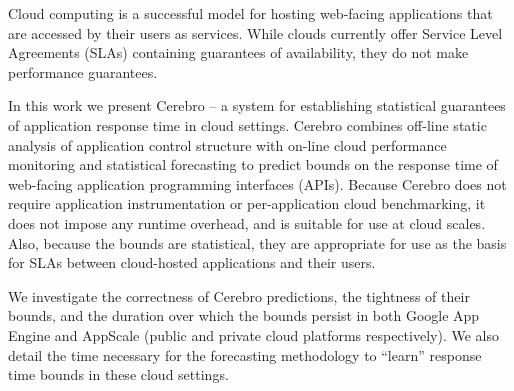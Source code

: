 Cloud computing is a successful model for hosting web-facing
applications that are accessed by their users as services.  While clouds
currently offer Service Level Agreements (SLAs) containing guarantees of
availability, they do not make performance guarantees.

In this work we present Cerebro -- a system for establishing statistical
guarantees of application response time in cloud settings.  Cerebro combines
off-line static analysis of application control structure with on-line cloud
performance monitoring and statistical forecasting to predict bounds on the
response time of web-facing application programming interfaces (APIs).
Because Cerebro does not require application instrumentation or 
per-application cloud benchmarking, it does not impose any runtime overhead,
and is suitable for use at cloud scales.  Also, because the bounds are
statistical, they are appropriate for use as the basis for SLAs between
cloud-hosted applications and their users.

We investigate the correctness of Cerebro predictions, the tightness of their
bounds, and the duration over which the bounds persist in both Google App
Engine and AppScale (public and private cloud platforms respectively).  
We also detail the time necessary for the forecasting 
methodology to ``learn'' response time bounds in these cloud settings. 


